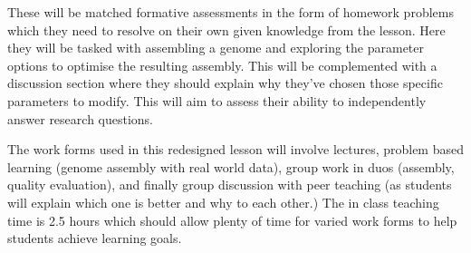 \documentclass[paper=a4,justified,a4paper]{tufte-handout}
\begin{document}
These will be matched formative assessments in the form of homework
problems which they need to resolve on their own given knowledge from
the lesson. Here they will be tasked with assembling a genome and
exploring the parameter options to optimise the resulting assembly. This
will be complemented with a discussion section where they should explain
why they've chosen those specific parameters to modify. This will aim to
assess their ability to independently answer research questions.

The work forms used in this redesigned lesson will involve lectures,
problem based learning (genome assembly with real world data), group
work in duos (assembly, quality evaluation), and finally group
discussion with peer teaching (as students will explain which one is
better and why to each other.) The in class teaching time is 2.5 hours
which should allow plenty of time for varied work forms to help students
achieve learning goals.




\end{document}
